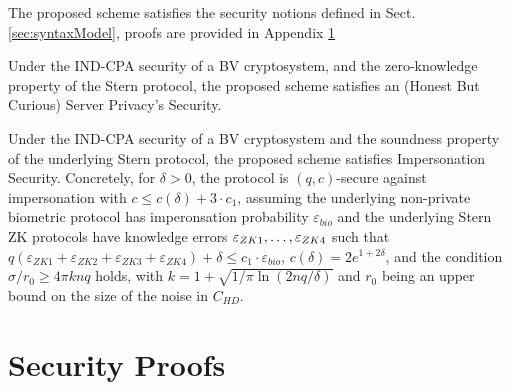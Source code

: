 \begin{description}
\begin{enumerate}
	\end{enumerate}
	The proposed scheme satisfies the security notions defined in Sect. \ref{sec:syntaxModel}, proofs are provided in Appendix
    \ref{append:Proofs}
	\begin{theorem}
		\label{theo:server}
		Under the IND-CPA security of a BV cryptosystem, and the zero-knowledge
		property of the Stern protocol, the proposed scheme satisfies an (Honest But Curious) Server Privacy's Security.
	\end{theorem}
	\begin{theorem}
		\label{theo:client}
		Under the IND-CPA security of a BV cryptosystem and the soundness
		property of the underlying Stern protocol, the proposed scheme satisfies Impersonation Security. Concretely, for $\delta>0$, the protocol is $(q,c)$-secure against impersonation with $c \leq c(\delta) + 3 \cdot c_1$, assuming the underlying non-private biometric protocol has imperonsation probability $\varepsilon_{bio}$ and the underlying Stern ZK protocols have knowledge errors $\varepsilon_{ZK1},\ldots,\varepsilon_{ZK4}$ such that $q(\varepsilon_{ZK1}+\varepsilon_{ZK2} +
\varepsilon_{ZK3} + \varepsilon_{ZK4}) + \delta \leq c_1 \cdot \varepsilon_{bio}$, $c(\delta) = 2 e^{1+2\delta}$, and the condition $\sigma/r_0 \geq 4 \pi k n q$ holds, with $k = 1 + \sqrt{1/\pi \ln(2nq/\delta)}$ and $r_0$ being an upper bound on the size of the noise in $C_{HD}$.
	\end{theorem}

\end{description}

\section{Security Proofs}
\label{append:Proofs}
